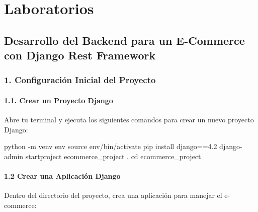 \documentclass[
  a4paper,
  DIV=11,
  numbers=noendperiod,
  onepage,
  openany]{scrreprt}
\newenvironment{Shaded}{\begin{snugshade}}{\end{snugshade}}
\newcommand{\AttributeTok}[1]{\textcolor[rgb]{0.40,0.45,0.13}{#1}}
\newcommand{\BuiltInTok}[1]{\textcolor[rgb]{0.00,0.23,0.31}{#1}}
\newcommand{\ExtensionTok}[1]{\textcolor[rgb]{0.00,0.23,0.31}{#1}}
\newcommand{\NormalTok}[1]{\textcolor[rgb]{0.00,0.23,0.31}{#1}}
\begin{document}
\chapter{}\label{section-1}

\chapter{}\label{section-2}

\part{Laboratorios}

\chapter{Desarrollo del Backend para un E-Commerce con Django Rest
Framework}\label{desarrollo-del-backend-para-un-e-commerce-con-django-rest-framework}

\section{1. Configuración Inicial del
Proyecto}\label{configuraciuxf3n-inicial-del-proyecto}

\subsection{1.1. Crear un Proyecto
Django}\label{crear-un-proyecto-django}

Abre tu terminal y ejecuta los siguientes comandos para crear un nuevo
proyecto Django:

\begin{Shaded}
\begin{Highlighting}[]
\ExtensionTok{python} \AttributeTok{{-}m}\NormalTok{ venv env}
\BuiltInTok{source}\NormalTok{ env/bin/activate}
\ExtensionTok{pip}\NormalTok{ install django==4.2}
\ExtensionTok{django{-}admin}\NormalTok{ startproject ecommerce\_project .}
\BuiltInTok{cd}\NormalTok{ ecommerce\_project}
\end{Highlighting}
\end{Shaded}

\subsection{1.2 Crear una Aplicación
Django}\label{crear-una-aplicaciuxf3n-django}

Dentro del directorio del proyecto, crea una aplicación para manejar el
e-commerce:
\end{document}
